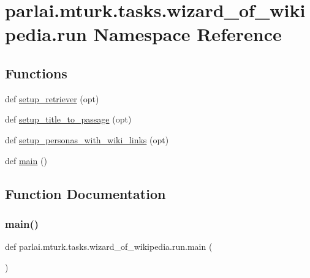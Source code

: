 \hypertarget{namespaceparlai_1_1mturk_1_1tasks_1_1wizard__of__wikipedia_1_1run}{}\section{parlai.\+mturk.\+tasks.\+wizard\+\_\+of\+\_\+wikipedia.\+run Namespace Reference}
\label{namespaceparlai_1_1mturk_1_1tasks_1_1wizard__of__wikipedia_1_1run}
\subsection*{Functions}
\begin{DoxyCompactItemize}
\item 
def \hyperlink{namespaceparlai_1_1mturk_1_1tasks_1_1wizard__of__wikipedia_1_1run_a22eb017ecd8f1a211fc5aac511d3102e}{setup\+\_\+retriever} (opt)
\item 
def \hyperlink{namespaceparlai_1_1mturk_1_1tasks_1_1wizard__of__wikipedia_1_1run_a59836c3be93d4b491fa9ddecbb4e83c0}{setup\+\_\+title\+\_\+to\+\_\+passage} (opt)
\item 
def \hyperlink{namespaceparlai_1_1mturk_1_1tasks_1_1wizard__of__wikipedia_1_1run_a5c16caa932230f93c418facd793be473}{setup\+\_\+personas\+\_\+with\+\_\+wiki\+\_\+links} (opt)
\item 
def \hyperlink{namespaceparlai_1_1mturk_1_1tasks_1_1wizard__of__wikipedia_1_1run_a2292712790bc7b0c052359562a4f0943}{main} ()
\end{DoxyCompactItemize}


\subsection{Function Documentation}
\mbox{\label{namespaceparlai_1_1mturk_1_1tasks_1_1wizard__of__wikipedia_1_1run_a2292712790bc7b0c052359562a4f0943}} 
\subsubsection{\texorpdfstring{main()}{main()}}
{\footnotesize\ttfamily def parlai.\+mturk.\+tasks.\+wizard\+\_\+of\+\_\+wikipedia.\+run.\+main (\begin{DoxyParamCaption}{ }\end{DoxyParamCaption})}

